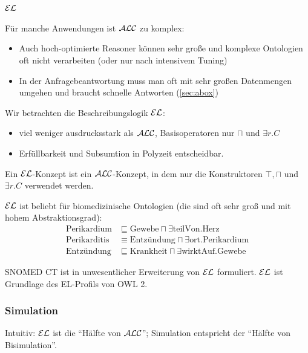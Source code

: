 
\subsection{\texorpdfstring{$\EL$}{EL}}\label{sec:el}

Für manche Anwendungen ist $\mathcal{A}\mathcal{L}\mathcal{C}$ zu komplex:
\begin{itemize}
    \item Auch hoch-optimierte Reasoner können sehr große und komplexe Ontologien oft nicht verarbeiten (oder nur nach intensivem Tuning)
    \item In der Anfragebeantwortung muss man oft mit sehr großen Datenmengen umgehen und braucht schnelle Antworten (\autoref{sec:abox})
\end{itemize}

Wir betrachten die Beschreibungslogik $\EL$:
\begin{itemize}
    \item viel weniger ausdrucksstark als $\mathcal{A}\mathcal{L}\mathcal{C}$, Basisoperatoren nur $\sqcap$ und $\exists r.C$
    \item Erfüllbarkeit und Subsumtion in Polyzeit entscheidbar.
\end{itemize}

\begin{definition}[$\EL$]
Ein $\EL$-Konzept ist ein $\mathcal{A}\mathcal{L}\mathcal{C}$-Konzept, in dem nur die Konstruktoren
$\top, \sqcap$ und $\exists r.C$ verwendet werden.
\end{definition}

$\EL$ ist beliebt für biomedizinische Ontologien (die sind oft sehr groß und mit hohem Abstraktionsgrad):
\begin{align*}
    \text{Perikardium} &\sqsubseteq \text{Gewebe} \sqcap \exists \text{teilVon}.\text{Herz}\\
    \text{Perikarditis} &\equiv \text{Entzündung} \sqcap \exists \text{ort}.\text{Perikardium}\\
    \text{Entzündung} & \sqsubseteq \text{Krankheit} \sqcap \exists \text{wirktAuf}.\text{Gewebe}
\end{align*}

SNOMED CT ist in unwesentlicher Erweiterung von $\EL$ formuliert. $\EL$ ist Grundlage des EL-Profils von OWL 2.

\subsubsection{Simulation}\label{simulation}

Intuitiv: $\EL$ ist die \enquote{Hälfte von $\mathcal{A}\mathcal{L}\mathcal{C}$}; Simulation entspricht der \enquote{Hälfte von Bisimulation}.

